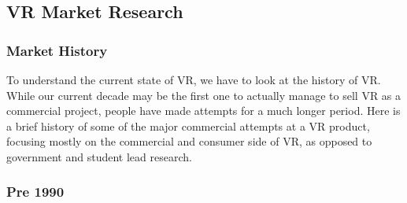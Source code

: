 \documentclass[a4paper,10pt,twoside]{article}
\begin{document}
\subsection{VR Market Research}
\subsubsection{Market History}
To understand the current state of VR, we have to look at the history of VR.  While our current decade may be the first one to actually manage to sell VR as a commercial project, people have made attempts for a much longer period.  Here is a brief history of some of the major commercial attempts at a VR product, focusing mostly on the commercial and consumer side of VR, as opposed to government and student lead research.

\subsubsection{Pre 1990}
	
\end{document}
